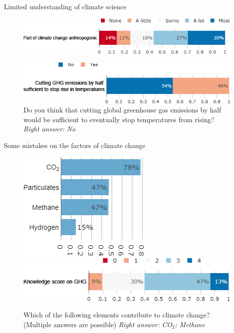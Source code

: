 \begin{framefont}{\small}
\begin{frame}{Limited understanding of climate science}%
\begin{figure}%
\centering
\caption{What part of climate change do you think is due to human activity? \footnotesize{\textit{Right answer: Most}}}
\includegraphics[width=.7\paperwidth]{../figures/FR/CC_anthropogenic_FR.png} 
\\
\caption{Do you think that cutting global greenhouse gas emissions by half would be sufficient to eventually stop temperatures from rising? \footnotesize{\textit{Right answer: No}}}
\includegraphics[width=.6\paperwidth]{../figures/FR/CC_dynamic_FR.png}

\end{figure}
\end{frame}

\begin{frame}{Some mistakes on the factors of climate change}%
\begin{figure}[h!]
\centering
\caption{Which of the following elements contribute to climate change? (Multiple answers are possible) \newline \footnotesize{\textit{Right answer: CO$_\text{2}$; Methane}}}
\centering
\includegraphics[width=.30\paperwidth]{../figures/FR/GHG_FR.png}
\vspace{.2cm} \\
\includegraphics[width=.61\paperwidth]{../figures/FR/score_GHG_FR.png}


\end{figure}
\end{frame}
\end{framefont}
